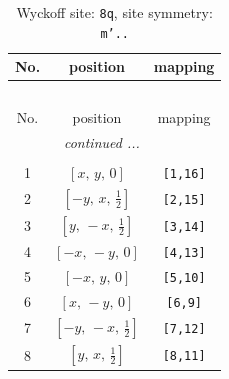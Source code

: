 \documentclass[fleqn,8pt]{jsarticle}
\begin{document}
\begin{longtable}{ccc}
\caption{Wyckoff site: {\tt 8q}, site symmetry: {\tt m'..}}
 \\
 \hline \hline
No. & position & mapping \\ \hline \endfirsthead

\multicolumn{2}{l}{\tablename\ \thetable{}} \\
 \hline \hline
No. & position & mapping \\ \hline \endhead

 \hline \hline
\multicolumn{2}{r}{\footnotesize\it continued ...} \\ \endfoot

 \hline \hline
\multicolumn{2}{r}{} \\ \endlastfoot

1 & $\left[ x,\, y,\, 0 \right]$ & {\tt [1,16]} \\ \hline
2 & $\left[ - y,\, x,\, \frac{1}{2} \right]$ & {\tt [2,15]} \\ \hline
3 & $\left[ y,\, - x,\, \frac{1}{2} \right]$ & {\tt [3,14]} \\ \hline
4 & $\left[ - x,\, - y,\, 0 \right]$ & {\tt [4,13]} \\ \hline
5 & $\left[ - x,\, y,\, 0 \right]$ & {\tt [5,10]} \\ \hline
6 & $\left[ x,\, - y,\, 0 \right]$ & {\tt [6,9]} \\ \hline
7 & $\left[ - y,\, - x,\, \frac{1}{2} \right]$ & {\tt [7,12]} \\ \hline
8 & $\left[ y,\, x,\, \frac{1}{2} \right]$ & {\tt [8,11]} \\
\end{longtable}
\renewcommand{\arraystretch}{1.2}
\end{document}
